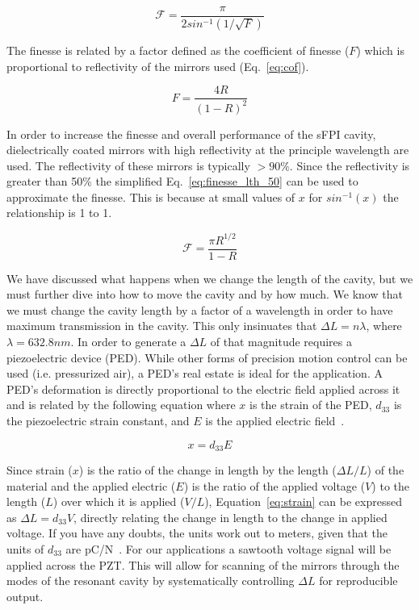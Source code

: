 \documentclass[12pt,journal]{IEEEtran}
\begin{document}
\begin{equation}
\mathcal{F} = \frac{\pi}{2sin^{-1}(1/\sqrt{F})}
\label{eq:finesse}
\end{equation}

The finesse is related by a factor defined as the coefficient of finesse ($F$) which is proportional to reflectivity of the mirrors used (Eq.~\ref{eq:cof}).

\begin{equation}
F = \frac{4R}{(1-R)^2}
\label{eq:cof}
\end{equation}  

In order to increase the finesse and overall performance of the sFPI cavity, dielectrically coated mirrors with high reflectivity at the principle wavelength are used. The reflectivity of these mirrors is typically $>90\%$. Since the reflectivity is greater than 50\% the simplified Eq.~\ref{eq:finesse_lth_50} can be used to approximate the finesse. This is because at small values of $x$ for $sin^{-1}(x)$ the relationship is 1 to 1. 

\begin{equation}
\mathcal{F} = \frac{\pi R^{1/2}}{1-R}
\label{eq:finesse_lth_50}
\end{equation}   

We have discussed what happens when we change the length of the cavity, but we must further dive into how to move the cavity and by how much. We know that we must change the cavity length by a factor of a wavelength in order to have maximum transmission in the cavity. This only insinuates that $\Delta L = n\lambda$, where $\lambda = 632.8 nm$. In order to generate a $\Delta L$ of that magnitude requires a piezoelectric device (PED). While other forms of precision motion control can be used (i.e. pressurized air), a PED's real estate is ideal for the application. A PED's deformation is directly proportional to the electric field applied across it and is related by the following equation where $x$ is the strain of the PED, $d_{33}$ is the piezoelectric strain constant, and $E$ is the applied electric field~\cite{piezo}. 

\begin{equation}
x = d_{33}E
\label{eq:strain}
\end{equation}   

Since strain ($x$) is the ratio of the change in length by the length ($\Delta L/L$) of the material and the applied electric ($E$) is the ratio of the applied voltage ($V$) to the length ($L$) over which it is applied ($V/L$), Equation~\ref{eq:strain} can be expressed as $\Delta L = d_{33}V$, directly relating the change in length to the change in applied voltage. If you have any doubts, the units work out to meters, given that the units of $d_{33}$ are pC/N~\cite{piezo}. For our applications a sawtooth voltage signal will be applied across the PZT. This will allow for scanning of the mirrors through the modes of the resonant cavity by systematically controlling $\Delta L$ for reproducible output. 
\end{document}
